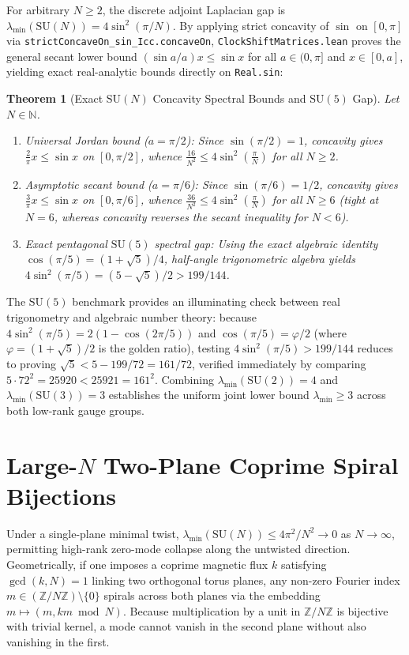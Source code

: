 \documentclass[11pt,a4paper]{article}
\newtheorem{theorem}{Theorem}[section]
\newcommand{\Z}{\mathbb{Z}}
\newcommand{\SU}{\mathrm{SU}}
\begin{document}
For arbitrary $N \ge 2$, the discrete adjoint Laplacian gap is $\lambda_{\min}(\SU(N)) = 4\sin^2(\pi/N)$. By applying strict concavity of $\sin$ on $[0, \pi]$ via \texttt{strictConcaveOn\_\-sin\_\-Icc.\-concaveOn}, \texttt{ClockShift\-Matrices.lean} proves the general secant lower bound $(\sin a / a) x \le \sin x$ for all $a \in (0, \pi]$ and $x \in [0, a]$, yielding exact real-analytic bounds directly on \texttt{Real.sin}:

\begin{theorem}[Exact $\SU(N)$ Concavity Spectral Bounds and $\SU(5)$ Gap]
Let $N \in \mathbb{N}$.
\begin{enumerate}
\item \emph{Universal Jordan bound ($a = \pi/2$):} Since $\sin(\pi/2) = 1$, concavity gives $\frac{2}{\pi} x \le \sin x$ on $[0, \pi/2]$, whence $\frac{16}{N^2} \le 4\sin^2\left(\frac{\pi}{N}\right)$ for all $N \ge 2$.
\item \emph{Asymptotic secant bound ($a = \pi/6$):} Since $\sin(\pi/6) = 1/2$, concavity gives $\frac{3}{\pi} x \le \sin x$ on $[0, \pi/6]$, whence $\frac{36}{N^2} \le 4\sin^2\left(\frac{\pi}{N}\right)$ for all $N \ge 6$ (tight at $N = 6$, whereas concavity reverses the secant inequality for $N < 6$).
\item \emph{Exact pentagonal $\SU(5)$ spectral gap:} Using the exact algebraic identity $\cos(\pi/5) = (1 + \sqrt{5})/4$, half-angle trigonometric algebra yields $4\sin^2(\pi/5) = (5 - \sqrt{5})/2 > 199/144$.
\end{enumerate}
\end{theorem}

The $\SU(5)$ benchmark provides an illuminating check between real trigonometry and algebraic number theory: because $4\sin^2(\pi/5) = 2(1 - \cos(2\pi/5))$ and $\cos(\pi/5) = \varphi / 2$ (where $\varphi = (1 + \sqrt{5})/2$ is the golden ratio), testing $4\sin^2(\pi/5) > 199/144$ reduces to proving $\sqrt{5} < 5 - 199/72 = 161/72$, verified immediately by comparing $5 \cdot 72^2 = 25920 < 25921 = 161^2$. Combining $\lambda_{\min}(\SU(2)) = 4$ and $\lambda_{\min}(\SU(3)) = 3$ establishes the uniform joint lower bound $\lambda_{\min} \ge 3$ across both low-rank gauge groups.

\section{Large-$N$ Two-Plane Coprime Spiral Bijections}
Under a single-plane minimal twist, $\lambda_{\min}(\SU(N)) \le 4\pi^2 / N^2 \to 0$ as $N \to \infty$, permitting high-rank zero-mode collapse along the untwisted direction. Geometrically, if one imposes a coprime magnetic flux $k$ satisfying $\gcd(k, N) = 1$ linking two orthogonal torus planes, any non-zero Fourier index $m \in (\Z/N\Z) \setminus \{0\}$ spirals across both planes via the embedding $m \mapsto (m, k m \bmod N)$. Because multiplication by a unit in $\Z/N\Z$ is bijective with trivial kernel, a mode cannot vanish in the second plane without also vanishing in the first.
\end{document}
